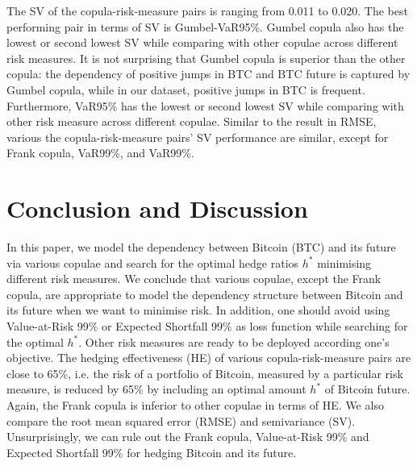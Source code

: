 
The SV of the copula-risk-measure pairs is ranging from 0.011 to 0.020.
The best performing pair in terms of SV is Gumbel-VaR95\%.
Gumbel copula also has the lowest or second lowest SV while comparing with other copulae across different risk measures.
It is not surprising that Gumbel copula is superior than the other copula:
the dependency of positive jumps in BTC and BTC future is captured by Gumbel copula, while in our dataset,
positive jumps in BTC is frequent.
Furthermore, VaR95\% has the lowest or second lowest SV while comparing with other risk measure across different copulae.
Similar to the result in RMSE, various the copula-risk-measure pairs' SV performance are similar, except for Frank copula, VaR99\%, and VaR99\%.



\section{Conclusion and Discussion}
In this paper, we model the dependency between Bitcoin (BTC) and its future via various copulae and search for
the optimal hedge ratios $h^*$ minimising different risk measures.
We conclude that various copulae, except the Frank copula, are appropriate to model the dependency structure between Bitcoin and its future when we want to minimise risk.
In addition, one should avoid using Value-at-Risk 99\% or Expected Shortfall 99\% as loss function while searching for the optimal $h^*$.
Other risk measures are ready to be deployed according one's objective.
The hedging effectiveness (HE) of various copula-risk-measure pairs are close to 65\%, i.e.
the risk of a portfolio of Bitcoin, measured by a particular risk measure, is reduced
by 65\% by including an optimal amount $h^*$ of Bitcoin future.
Again, the Frank copula is inferior to other copulae in terms of HE.
We also compare the root mean squared error (RMSE) and semivariance (SV).
Unsurprisingly, we can rule out the Frank copula, Value-at-Risk 99\% and Expected Shortfall 99\%
for hedging Bitcoin and its future.

